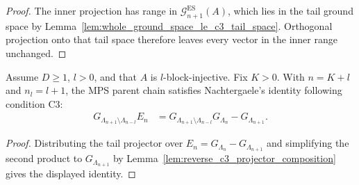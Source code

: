 \begin{proof}
    \leanok
    The inner projection has range in
    $\mathcal G_{n+1}^{\mathrm{ES}}(A)$, which lies in the tail ground space by
    Lemma~\ref{lem:whole_ground_space_le_c3_tail_space}.  Orthogonal projection
    onto that tail space therefore leaves every vector in the inner range
    unchanged.
\end{proof}

\begin{lemma}
    \label{thm:exact_c3_martingale_difference_identity}
    \leanok
    Assume $D\geq1$, $l>0$, and that $A$ is $l$-block-injective.  Fix $K>0$.
    With $n=K+l$ and $n_l=l+1$, the MPS parent chain satisfies Nachtergaele's
    identity following condition C3:
    \begin{align}
        G_{\Lambda_{n+1}\setminus\Lambda_{n-l}}E_n
         & =G_{\Lambda_{n+1}\setminus\Lambda_{n-l}}G_{\Lambda_n}
        -G_{\Lambda_{n+1}}.
        \label{eq:exact_c3_martingale_difference_identity}
    \end{align}
\end{lemma}

\begin{proof}
    \leanok
    Distributing the tail projector over
    $E_n=G_{\Lambda_n}-G_{\Lambda_{n+1}}$ and simplifying the second product
    to $G_{\Lambda_{n+1}}$ by
    Lemma~\ref{lem:reverse_c3_projector_composition} gives the displayed
    identity.
\end{proof}


